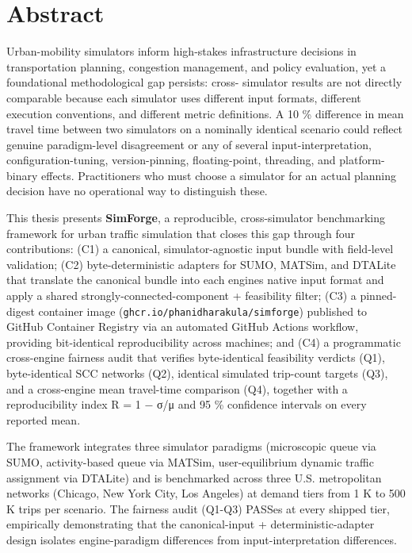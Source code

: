 \clearpage
\thispagestyle{plain}
\section*{Abstract}
{}

Urban-mobility simulators inform high-stakes infrastructure decisions in
transportation planning, congestion management, and policy evaluation,
yet a foundational methodological gap persists: cross- simulator results
are not directly comparable because each simulator uses different input
formats, different execution conventions, and different metric
definitions. A 10 \% difference in mean travel time between two
simulators on a nominally identical scenario could reflect genuine
paradigm-level disagreement or any of several input-interpretation,
configuration-tuning, version-pinning, floating-point, threading, and
platform-binary effects. Practitioners who must choose a simulator for
an actual planning decision have no operational way to distinguish
these.

This thesis presents \textbf{SimForge}, a reproducible, cross-simulator
benchmarking framework for urban traffic simulation that closes this gap
through four contributions: (C1) a canonical, simulator-agnostic input
bundle with field-level validation; (C2) byte-deterministic adapters for
SUMO, MATSim, and DTALite that translate the canonical bundle into each
engine\textquotesingle s native input format and apply a shared
strongly-connected-component + feasibility filter; (C3) a pinned-digest
container image (\texttt{ghcr.io/phanidharakula/simforge}) published to
GitHub Container Registry via an automated GitHub Actions workflow,
providing bit-identical reproducibility across machines; and (C4) a
programmatic cross-engine fairness audit that verifies byte-identical
feasibility verdicts (Q1), byte-identical SCC networks (Q2), identical
simulated trip-count targets (Q3), and a cross-engine mean travel-time
comparison (Q4), together with a reproducibility index R = 1 − σ/μ and
95 \% confidence intervals on every reported mean.

The framework integrates three simulator paradigms (microscopic queue
via SUMO, activity-based queue via MATSim, user-equilibrium dynamic
traffic assignment via DTALite) and is benchmarked across three U.S.
metropolitan networks (Chicago, New York City, Los Angeles) at demand
tiers from 1 K to 500 K trips per scenario. The fairness audit (Q1-Q3)
PASSes at every shipped tier, empirically demonstrating that the
canonical-input + deterministic-adapter design isolates engine-paradigm
differences from input-interpretation differences.

